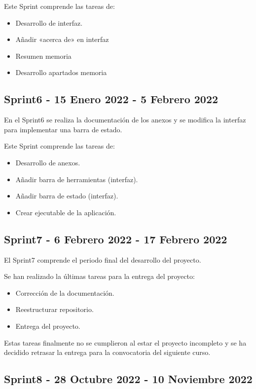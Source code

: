 Este Sprint comprende las tareas de:

\begin{itemize}
\item Desarrollo de interfaz.
\item Añadir «acerca de» en interfaz
\item Resumen memoria
\item Desarrollo apartados memoria
\end{itemize}
\subsection{Sprint6 - 15 Enero 2022 - 5 Febrero 2022}

En el Sprint6 se realiza la documentación de los anexos y se modifica la interfaz para implementar una barra de estado.

Este Sprint comprende las tareas de:

\begin{itemize}
\item Desarrollo de anexos.
\item Añadir barra de herramientas (interfaz).
\item Añadir barra de estado (interfaz).
\item Crear ejecutable de la aplicación.
\end{itemize}

\subsection{Sprint7 - 6 Febrero 2022 - 17 Febrero 2022}

El Sprint7 comprende el periodo final del desarrollo del proyecto.

Se han realizado la últimas tareas para la entrega del proyecto:

\begin{itemize}
\item Corrección de la documentación.
\item Reestructurar repositorio.
\item Entrega del proyecto.
\end{itemize}

Estas tareas finalmente no se cumplieron al estar el proyecto incompleto y se ha decidido retrasar la entrega para la convocatoria del siguiente curso.

\subsection{Sprint8 - 28 Octubre 2022 - 10 Noviembre 2022}

